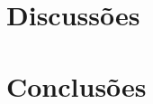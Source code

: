 \documentclass[smallextended]{svjour3}       %
\begin{document}

\section{Discussões}




\section{Conclusões}
\label{conclusions}




\end{document}

